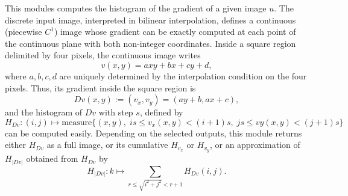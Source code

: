 This modules computes the histogram of the gradient of a given image $u$.
The discrete input image, interpreted in bilinear interpolation, defines 
a continuous (piecewise $C^1$) image whose gradient can be exactly computed
at each point of the continuous plane with both non-integer coordinates.
Inside a square region delimited by four pixels, the continuous image writes
$$v(x,y) = axy+bx+cy+d,$$
where $a,b,c,d$ are uniquely determined by the interpolation condition on
the four pixels. Thus, its gradient inside the square region is
$$Dv(x,y) := (v_x,v_y) = (ay+b,ax+c),$$
and the histogram of $Dv$ with step $s$, defined by
$$H_{Dv}: (i,j) \mapsto \mathrm{measure}
\{ (x,y),\; is \leq v_x(x,y) < (i+1)s, \; js\leq vy(x,y) < (j+1)s\}$$
can be computed easily.
Depending on the selected outputs, this module returns either
$H_{Dv}$ as a full image, or its cumulative $H_{v_x}$ or $H_{v_y}$,
or an approximation of $H_{|Dv|}$ obtained from $H_{Dv}$ by
$$H_{|Dv|} : k \mapsto \sum_{r\leq \sqrt{i^2+j^2} < r+1} H_{Dv}(i,j).$$

